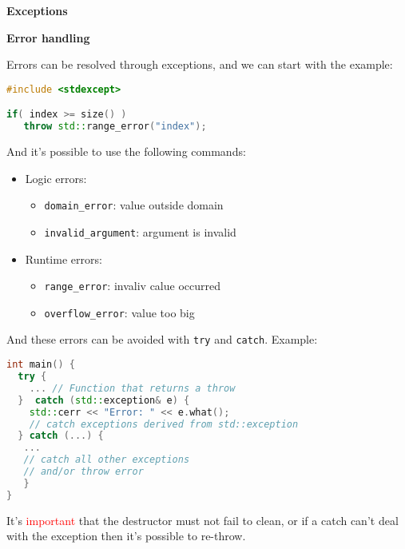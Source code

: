 \documentclass[fontsize=8pt, a4paper, landscape, fleqn]{scrartcl}
\renewcommand{\section}[1]{%
    \noindent\colorbox{sectioncolor}{%
        \parbox{\dimexpr\columnwidth-2\fboxsep}{\color{white}\textbf{#1}}}%
    \vspace{0.5mm}%
}
\renewcommand{\subsection}[1]{%
    \noindent\colorbox{subsectioncolor}{%
        \parbox{\dimexpr\columnwidth-2\fboxsep}{\color{white}\textbf{#1}}}%
    \vspace{0.5mm}%
}
\begin{document}
\begin{multicols*}{3}[\raggedcolumns]
    \section{Exceptions}
    \subsection{Error handling} 
    Errors can be resolved through exceptions, and we can start with the example:

\begin{lstlisting}[language=C++, breaklines]
#include <stdexcept>

if( index >= size() )
   throw std::range_error("index"); \end{lstlisting}

    And it's possible to use the following commands:

    \begin{itemize}
            \item Logic errors:
        \begin{itemize}          \item \lstinline{domain_error}: value outside domain
            \item \lstinline{invalid_argument}: argument is invalid
        \end{itemize}
            \item Runtime errors: 
        \begin{itemize}
            \item \lstinline{range_error}: invaliv calue occurred
            \item \lstinline{overflow_error}: value too big
        \end{itemize}
    \end{itemize}

    And these errors can be avoided with \lstinline{try} and \lstinline{catch}. Example:

    \begin{lstlisting}[language=C++, breaklines]
int main() {
  try {
    ... // Function that returns a throw
  }  catch (std::exception& e) {
    std::cerr << "Error: " << e.what();
    // catch exceptions derived from std::exception
  } catch (...) {
   ...
   // catch all other exceptions
   // and/or throw error
   }
} \end{lstlisting}

    It's \textcolor{red}{important} that the destructor must not fail to clean, or if a catch can't deal with the exception then it's possible to re-throw.


\end{multicols*}
\end{document}
